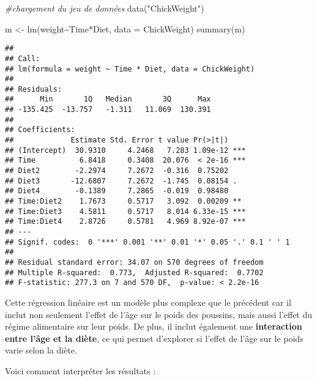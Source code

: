 \documentclass[
]{article}
\newenvironment{Shaded}{\begin{snugshade}}{\end{snugshade}}
\newcommand{\AttributeTok}[1]{\textcolor[rgb]{0.77,0.63,0.00}{#1}}
\newcommand{\CommentTok}[1]{\textcolor[rgb]{0.56,0.35,0.01}{\textit{#1}}}
\newcommand{\FunctionTok}[1]{\textcolor[rgb]{0.00,0.00,0.00}{#1}}
\newcommand{\NormalTok}[1]{#1}
\newcommand{\OtherTok}[1]{\textcolor[rgb]{0.56,0.35,0.01}{#1}}
\newcommand{\SpecialCharTok}[1]{\textcolor[rgb]{0.00,0.00,0.00}{#1}}
\newcommand{\StringTok}[1]{\textcolor[rgb]{0.31,0.60,0.02}{#1}}
\begin{document}
\begin{Shaded}
\begin{Highlighting}[]
\CommentTok{\#chargement du jeu de données}
\FunctionTok{data}\NormalTok{(}\StringTok{"ChickWeight"}\NormalTok{)}

\NormalTok{m }\OtherTok{\textless{}{-}} \FunctionTok{lm}\NormalTok{(weight}\SpecialCharTok{\textasciitilde{}}\NormalTok{Time}\SpecialCharTok{*}\NormalTok{Diet, }\AttributeTok{data =}\NormalTok{ ChickWeight)}
\FunctionTok{summary}\NormalTok{(m)}
\end{Highlighting}
\end{Shaded}

\begin{verbatim}
## 
## Call:
## lm(formula = weight ~ Time * Diet, data = ChickWeight)
## 
## Residuals:
##      Min       1Q   Median       3Q      Max 
## -135.425  -13.757   -1.311   11.069  130.391 
## 
## Coefficients:
##             Estimate Std. Error t value Pr(>|t|)    
## (Intercept)  30.9310     4.2468   7.283 1.09e-12 ***
## Time          6.8418     0.3408  20.076  < 2e-16 ***
## Diet2        -2.2974     7.2672  -0.316  0.75202    
## Diet3       -12.6807     7.2672  -1.745  0.08154 .  
## Diet4        -0.1389     7.2865  -0.019  0.98480    
## Time:Diet2    1.7673     0.5717   3.092  0.00209 ** 
## Time:Diet3    4.5811     0.5717   8.014 6.33e-15 ***
## Time:Diet4    2.8726     0.5781   4.969 8.92e-07 ***
## ---
## Signif. codes:  0 '***' 0.001 '**' 0.01 '*' 0.05 '.' 0.1 ' ' 1
## 
## Residual standard error: 34.07 on 570 degrees of freedom
## Multiple R-squared:  0.773,  Adjusted R-squared:  0.7702 
## F-statistic: 277.3 on 7 and 570 DF,  p-value: < 2.2e-16
\end{verbatim}

Cette régression linéaire est un modèle plus complexe que le précédent car il inclut non seulement l'effet de l'âge sur le poids des poussins, mais aussi l'effet du régime alimentaire sur leur poids. De plus, il inclut également une \textbf{interaction entre l'âge et la diète}, ce qui permet d'explorer si l'effet de l'âge sur le poids varie selon la diète.

Voici comment interpréter les résultats :
\end{document}
